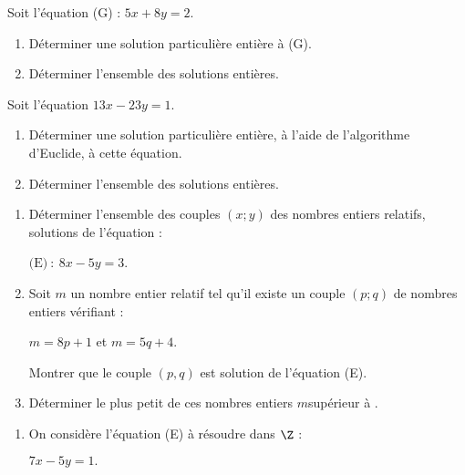 \documentclass{cornouaille}
\begin{document}
\begin{colonne*exercice}
\begin{exercice}
Soit l’équation (G) : $5x + 8y = 2$.
\begin{enumerate}
\item Déterminer une solution particulière entière à (G).
\item Déterminer l’ensemble des solutions entières.
\end{enumerate}
\end{exercice}

\begin{exercice}
Soit l'équation $13x - 23y = 1$.
\begin{enumerate}
\item Déterminer une solution particulière entière, à l'aide de
  l'algorithme d’Euclide, à cette équation.
\item Déterminer l'ensemble des solutions entières.
\end{enumerate}
\end{exercice}

\begin{exercice}
\begin{enumerate}
\item Déterminer l’ensemble des couples $(x; y)$ des nombres entiers
  relatifs, solutions de l'équation :

{\centering $\text{(E)}~:~8x - 5y = 3$.\par}

\item Soit $m$ un nombre entier relatif tel qu'il existe un couple
  $(p; q)$ de nombres entiers vérifiant :

$m=8p + 1$ et $m = 5q + 4$.

Montrer que le couple $(p, q)$ est solution de l’équation (E).

\item Déterminer le plus petit de ces nombres entiers $m$\linebreak supérieur à
  .
\end{enumerate}
\end{exercice}

\begin{exercice}
\begin{enumerate}
\item On considère l'équation (E) à résoudre dans $\Z$ :

{\centering $7x - 5y = 1.$\par}


\end{enumerate}
\end{exercice}
\end{colonne*exercice}
\end{document}
